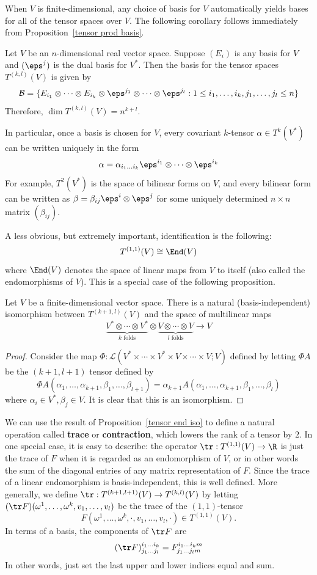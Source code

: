 When $V$ is finite-dimensional, any choice of basis for $V$ automatically yields
bases for all of the tensor spaces over $V$. The following corollary follows immediately from Proposition~\ref{tensor prod basis}.
\begin{corollary}
Let $V$ be an $n$-dimensional real vector space. Suppose $(E_i)$ is any basis for $V$ and $(\eps^j)$ is the dual basis for $V^*$. Then the basis for the tensor spaces $T^{(k,l)}(V)$ is given by
\[\mathcal{B}=\{E_{i_1}\otimes\cdots\otimes E_{i_k}\otimes\eps^{j_1}\otimes\cdots\otimes\eps^{j_l}:1\leq i_1,\dots,i_k,j_1,\dots,j_l\leq n\}\]
Therefore, $\dim T^{(k,l)}(V)=n^{k+l}$.
\end{corollary}
In particular, once a basis is chosen for $V$, every covariant $k$-tensor $\alpha\in T^k(V^*)$ can be written uniquely in the form
\[\alpha=\alpha_{i_1\dots i_k}\eps^{i_1}\otimes\cdots\otimes\eps^{i_k}\]
For example, $T^2(V^*)$ is the space of bilinear forms on $V$, and every bilinear form can be written as $\beta=\beta_{ij}\eps^i\otimes\eps^j$ for some uniquely determined $n\times n$ matrix $(\beta_{ij})$.\par
A less obvious, but extremely important, identification is the following:
\[T^{(1,1)}(V)\cong\End(V)\]
where $\End(V)$ denotes the space of linear maps from $V$ to itself 
(also called the endomorphisms of $V$). This is a special case of the 
following proposition.
\begin{proposition}\label{tensor end iso}
Let $V$ be a finite-dimensional vector space. There is a natural (basis-independent) isomorphism 
between $T^{(k+1,l)}(V)$ and the space of multilinear maps
\[\underbrace{V^*\otimes\cdots\otimes V^*}_{\text{$k$ folds}}\otimes \underbrace{V\otimes\cdots\otimes V}_{\text{$l$ folds}}\to V\]
\end{proposition}
\begin{proof}
Consider the map $\varPhi:\mathcal{L}(V^*\times\cdots\times V^*\times V\times\cdots\times V;V)$ defined by letting $\varPhi A$ be the $(k+1,l+1)$ tensor defined 
by
\[\varPhi A(\alpha_1,\dots,\alpha_{k+1},\beta_1,\dots,\beta_{l+1})=\alpha_{k+1}A(\alpha_1,\dots,\alpha_{k+1},\beta_1,\dots,\beta_{l})\]
where $\alpha_i\in V^*,\beta_j\in V$. It is clear that this is an isomorphism.
\end{proof}
We can use the result of Proposition~\ref{tensor end iso} to define a 
natural operation called \textbf{trace} or \textbf{contraction}, which 
lowers the rank of a tensor by $2$. In one special case, it is easy to 
describe: the operator $\tr:T^{(1,1)}(V)\to\R$ is just the trace of $F$ 
when it is regarded as an endomorphism of $V$, or in other words the sum 
of the diagonal entries of any matrix representation of $F$. Since the 
trace of a linear endomorphism is basis-independent, this is well defined. 
More generally, we define $\tr:T^{(k+1,l+1)}(V)\to T^{(k,l)}(V)$ by 
letting $(\tr F)(\omega^1,\dots,\omega^k,v_1,\dots,v_l)$ be the trace
of the $(1,1)$-tensor
\[F(\omega^1,\dots,\omega^k,\cdot,v_1,\dots,v_l,\cdot)\in T^{(1,1)}(V).\]
In terms of a basis, the components of $\tr F$ are
\[(\tr F)^{i_1\dots i_k}_{j_1\dots j_l}=F^{i_1\dots i_km}_{j_1\dots j_lm}\]
In other words, just set the last upper and lower indices equal and sum.
